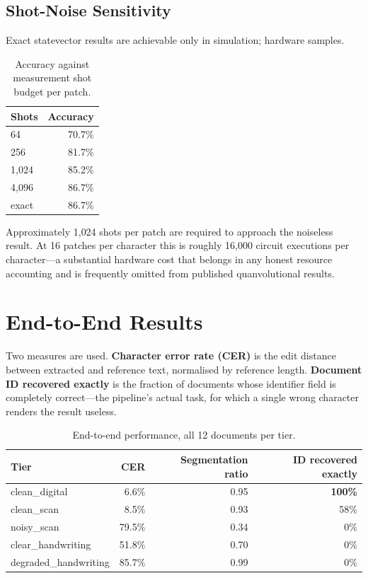 \documentclass[11pt,a4paper]{article}
\begin{document}
\subsection{Shot-Noise Sensitivity}

Exact statevector results are achievable only in simulation; hardware samples.

\begin{table}[h]
\centering
\caption{Accuracy against measurement shot budget per patch.}
\begin{tabular}{@{}lr@{}}
\toprule
Shots & Accuracy \\
\midrule
64 & 70.7\% \\
256 & 81.7\% \\
1{,}024 & 85.2\% \\
4{,}096 & 86.7\% \\
exact & 86.7\% \\
\bottomrule
\end{tabular}
\end{table}

Approximately 1{,}024 shots per patch are required to approach the noiseless
result. At 16 patches per character this is roughly 16{,}000 circuit executions
per character---a substantial hardware cost that belongs in any honest resource
accounting and is frequently omitted from published quanvolutional results.

\section{End-to-End Results}
\label{sec:endtoend}

Two measures are used. \textbf{Character error rate (CER)} is the edit distance
between extracted and reference text, normalised by reference length.
\textbf{Document ID recovered exactly} is the fraction of documents whose
identifier field is completely correct---the pipeline's actual task, for which a
single wrong character renders the result useless.

\begin{table}[h]
\centering
\caption{End-to-end performance, all 12 documents per tier.}
\begin{tabular}{@{}lrrr@{}}
\toprule
Tier & CER & Segmentation ratio & ID recovered exactly \\
\midrule
clean\_digital & 6.6\% & 0.95 & \textbf{100\%} \\
clean\_scan & 8.5\% & 0.93 & 58\% \\
noisy\_scan & 79.5\% & 0.34 & 0\% \\
clear\_handwriting & 51.8\% & 0.70 & 0\% \\
degraded\_handwriting & 85.7\% & 0.99 & 0\% \\
\bottomrule
\end{tabular}
\end{table}
\end{document}
